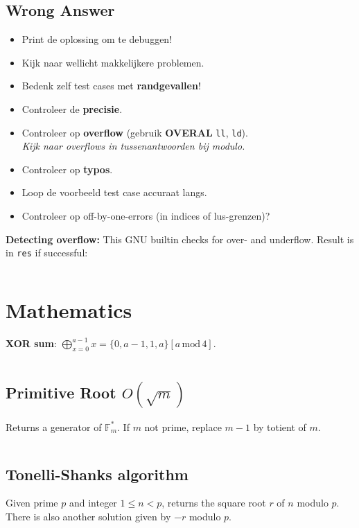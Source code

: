\documentclass[9pt,a4paper,landscape,oneside]{amsart}
\newcommand{\mintedstyle}[2]{\inputminted{#1}{code/#2}}
\newcommand{\code}[1]{\mintedstyle{cpp}{#1}}
\newenvironment{myitemize}
{\begin{itemize}[leftmargin=.3cm]
	\setlength{\itemsep}{0pt}
	\setlength{\parskip}{0pt}
	\setlength{\parsep}{0pt}     }
{ \end{itemize}                  }
\begin{document}
\begin{multicols*}{3}
\subsection{Wrong Answer}

\begin{myitemize}
	\item Print de oplossing om te debuggen!
	\item Kijk naar wellicht makkelijkere problemen.
	\item Bedenk zelf test cases met \textbf{randgevallen}!
	\item Controleer de \textbf{precisie}.
	\item Controleer op \textbf{overflow} (gebruik \textbf{OVERAL} \texttt{ll}, \texttt{ld}).
		\\ \textit{Kijk naar overflows in tussenantwoorden bij modulo.}
	\item Controleer op \textbf{typo\textquotesingle s}.
	\item Loop de voorbeeld test case accuraat langs.
	\item Controleer op off-by-one-errors (in indices of lus-grenzen)?
\end{myitemize}

\textbf{Detecting overflow:}
This GNU builtin checks for over- and underflow. Result is in \texttt{res} if successful:
\code{other/overflow.cpp}

\section{Mathematics}

\textbf{XOR sum}: $\bigoplus_{x=0}^{a - 1} x = \{0, a - 1, 1, a\}[a \, \mathrm{mod} \, 4]$.

\code{math/math.cpp}

\subsection{Primitive Root $O(\sqrt{m})$}
Returns a generator of $\mathbb{F}_m^*$. If $m$ not prime, replace $m-1$ by totient of $m$.
\code{math/primitive_root.cpp}

\subsection{Tonelli-Shanks algorithm}
Given prime $p$ and integer $1\leq n<p$, returns the square root $r$ of
$n$ modulo $p$. There is also another solution given by $-r$ modulo
$p$.
\code{math/tonelli_shanks.cpp}


\end{multicols*}
\end{document}
